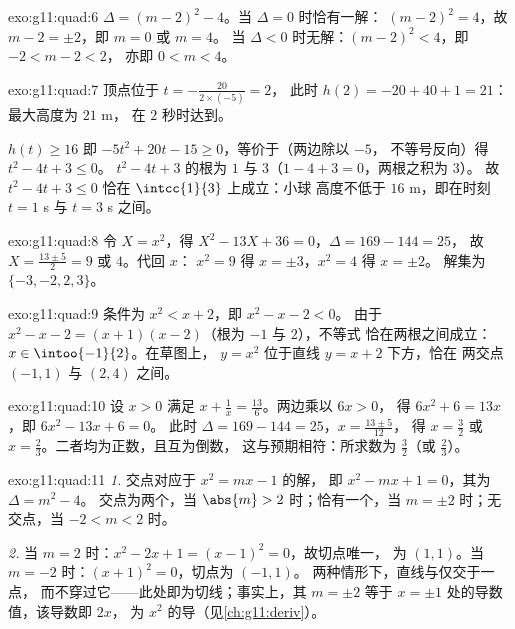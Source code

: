 \begin{solution}{exo:g11:quad:6}
$\Delta = (m-2)^2 - 4$。当 $\Delta = 0$ 时恰有一解：
$(m-2)^2 = 4$，故 $m - 2 = \pm 2$，即 $m = 0$ 或 $m = 4$。
当 $\Delta < 0$ 时无解：$(m-2)^2 < 4$，即 $-2 < m - 2 < 2$，
亦即 $0 < m < 4$。
\end{solution}

\begin{solution}{exo:g11:quad:7}
顶点位于 $t = -\frac{20}{2 \times (-5)} = 2$，
此时 $h(2) = -20 + 40 + 1 = 21$：最大高度为 $21$ m，
在 $2$ 秒时达到。

$h(t) \geq 16$ 即 $-5t^2 + 20t - 15 \geq 0$，等价于（两边除以 $-5$，
不等号反向）得 $t^2 - 4t + 3 \leq 0$。
$t^2-4t+3$ 的根为 $1$ 与 $3$（$1 - 4 + 3 = 0$，两根之积为 $3$）。
故 $t^2 - 4t + 3 \leq 0$ 恰在 $\intcc{1}{3}$ 上成立：小球
高度不低于 $16$ m，即在时刻 $t = 1$ s 与 $t = 3$ s 之间。
\end{solution}

\begin{solution}{exo:g11:quad:8}
令 $X = x^2$，得 $X^2 - 13X + 36 = 0$，$\Delta = 169 - 144 = 25$，
故 $X = \frac{13 \pm 5}{2} = 9$ 或 $4$。代回 $x$：
$x^2 = 9$ 得 $x = \pm 3$，$x^2 = 4$ 得 $x = \pm 2$。
解集为 $\{-3, -2, 2, 3\}$。
\end{solution}

\begin{solution}{exo:g11:quad:9}
条件为 $x^2 < x + 2$，即 $x^2 - x - 2 < 0$。
由于 $x^2 - x - 2 = (x+1)(x-2)$（根为 $-1$ 与 $2$），不等式
恰在两根之间成立：$x \in \intoo{-1}{2}$。在草图上，
 $y = x^2$ 位于直线 $y = x+2$ 下方，恰在
两交点 $(-1, 1)$ 与 $(2, 4)$ 之间。
\end{solution}

\begin{solution}{exo:g11:quad:10}
设 $x > 0$ 满足 $x + \frac1x = \frac{13}{6}$。两边乘以 $6x > 0$，
得 $6x^2 + 6 = 13x$，即 $6x^2 - 13x + 6 = 0$。
此时 $\Delta = 169 - 144 = 25$，$x = \frac{13 \pm 5}{12}$，
得 $x = \frac32$ 或 $x = \frac23$。二者均为正数，且互为倒数，
这与预期相符：所求数为 $\frac32$（或 $\frac23$）。
\end{solution}

\begin{solution}{exo:g11:quad:11}
\emph{1.} 交点对应于 $x^2 = mx - 1$ 的解，
即 $x^2 - mx + 1 = 0$，其为 $\Delta = m^2 - 4$。
交点为两个，当 $\abs{m} > 2$ 时；恰有一个，当 $m = \pm 2$ 时；无交点，当 $-2 < m < 2$ 时。

\emph{2.} 当 $m = 2$ 时：$x^2 - 2x + 1 = (x-1)^2 = 0$，故切点唯一，
为 $(1, 1)$。当 $m = -2$ 时：$(x+1)^2 = 0$，切点为 $(-1, 1)$。
两种情形下，直线与仅交于一点，
而不穿过它——此处即为切线；事实上，其 $m = \pm 2$
等于 $x = \pm 1$ 处的导数值，该导数即 $2x$，
为 $x^2$ 的导（见\cref{ch:g11:deriv}）。
\end{solution}

